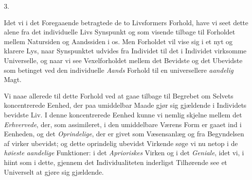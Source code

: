 \documentclass[12pt,a4paper,openany]{book}
\newcommand{\secnum}[1]{\par\begin{center}#1\end{center}\par\nobreak}
\begin{document}
\secnum{3.}

Idet vi i det Foregaaende betragtede de to Livsformers
Forhold, have vi seet dette alene fra det individuelle Livs
Synspunkt og som visende tilbage til Forholdet mellem
Natursiden og Aandssiden i os. Men Forholdet vil vise
sig i et nyt og klarere Lys, naar Synspunktet udvides fra
Individet til det i Individet virksomme Universelle, og naar
vi see Vexelforholdet mellem det Bevidste og det Ubevidste som
betinget ved den individuelle \emph{Aands} Forhold til en universellere
\emph{aandelig} Magt.

Vi naae allerede til dette Forhold ved at gaae tilbage
til Begrebet om Selvets koncentrerede Eenhed, der paa umiddelbar
Maade gjør sig gjældende i Individets bevidste Liv.
I denne koncentrerede Eenhed kunne vi nemlig skjelne mellem
det \emph{Erhvervede}, der, som assimileret, i den umiddelbare
Værens Form er gaaet ind i Eenheden, og det \emph{Oprindelige},
der er givet som Væsensanlæg og fra Begyndelsen af
virker ubevidst; og dette oprindelig ubevidst Virkende søge
vi nu netop i de \emph{høieste aandelige} Funktioner: i det
\emph{Aprioriskes} Virken og i det \emph{Geniale}, idet vi, i hiint
som i dette, gjennem det Individualiteten inderligst Tilhørende
see et Universelt at gjøre sig gjældende.
\end{document}
